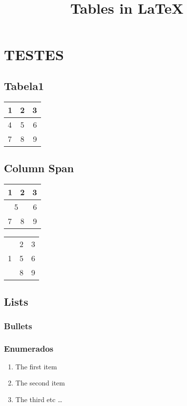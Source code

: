 \documentclass[12pt]{article}  %
\begin{document}
 

\title{\LARGE Tables in \LaTeX }

\section{TESTES} 

\subsection{Tabela1}

\begin{tabular}{|  l  | c | r | }
  \hline                       
  1 & 2 & 3 \\ \hline
  4 & 5 & 6 \\ \hline
  7 & 8 & 9 \\
  \hline  
\end{tabular}

\subsection{Column Span} 

\begin{tabular}{|  l  | c | r | }
  \hline                       
  1 & 2 & 3 \\ \hline
  \multicolumn{2}{|c|}{ 5 } & 6 \\ \hline
  7 & 8 & 9 \\ 
  \hline  
\end{tabular}



\begin{tabular}{|  l  | c | r | }
  \hline      
  \multirow{3}{*}{1} & 2 & 3 \\ \cline{2-3}
   & 5 & 6 \\ \cline{2-3}
   & 8 & 9 \\
  \hline  
\end{tabular}

\subsection{Lists}

\subsubsection{Bullets}


\subsubsection{Enumerados}

\begin{enumerate}
  \item The first item
  \item The second item
  \item The third etc \ldots
\end{enumerate}
\end{document}
